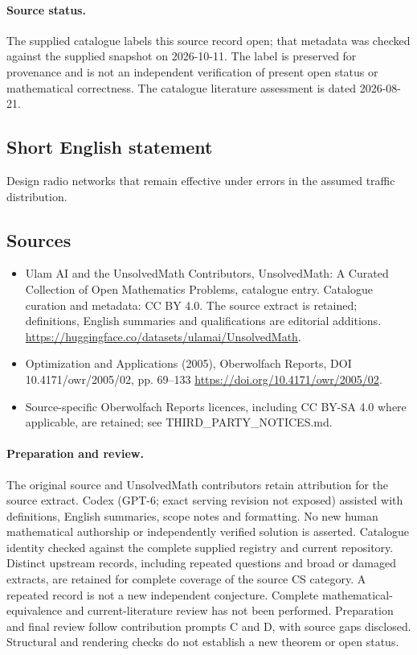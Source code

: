 \documentclass[11pt]{article}
\begin{document}
\paragraph{Source status.}
The supplied catalogue labels this source record open; that metadata was checked against the supplied snapshot on 2026-10-11. The label is preserved for provenance and is not an independent verification of present open status or mathematical correctness. The catalogue literature assessment is dated 2026-08-21.
\subsection{Short English statement}
Design radio networks that remain effective under errors in the assumed traffic distribution.
\subsection{Sources}
\begin{itemize}
\item[S1] Ulam AI and the UnsolvedMath Contributors, UnsolvedMath: A Curated Collection of Open Mathematics Problems, catalogue entry. Catalogue curation and metadata: CC BY 4.0. The source extract is retained; definitions, English summaries and qualifications are editorial additions.
\url{https://huggingface.co/datasets/ulamai/UnsolvedMath}.
\item[S2] Optimization and Applications (2005), Oberwolfach Reports, DOI 10.4171/owr/2005/02, pp. 69--133
\url{https://doi.org/10.4171/owr/2005/02}.
\item Source-specific Oberwolfach Reports licences, including CC BY-SA 4.0 where applicable, are retained; see THIRD\_PARTY\_NOTICES.md.
\end{itemize}
\paragraph{Preparation and review.}
The original source and UnsolvedMath contributors retain attribution for the source extract. Codex (GPT-6; exact serving revision not exposed) assisted with definitions, English summaries, scope notes and formatting. No new human mathematical authorship or independently verified solution is asserted. Catalogue identity checked against the complete supplied registry and current repository. Distinct upstream records, including repeated questions and broad or damaged extracts, are retained for complete coverage of the source CS category. A repeated record is not a new independent conjecture. Complete mathematical-equivalence and current-literature review has not been performed. Preparation and final review follow contribution prompts C and D, with source gaps disclosed. Structural and rendering checks do not establish a new theorem or open status.
\label{end:statement}
\end{document}

